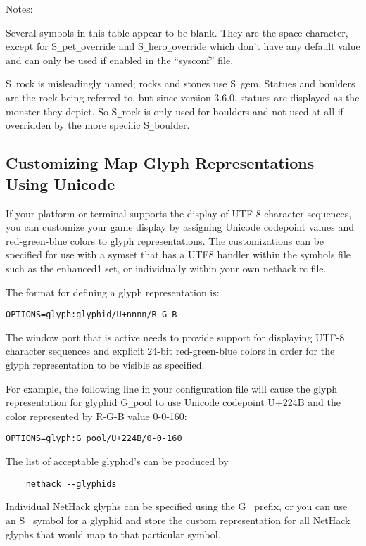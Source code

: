 Notes:

Several symbols in this table appear to be blank.
They are the space character, except for S\verb+_+pet\verb+_+override
and S\verb+_+hero\verb+_+override which don't have any default value
and can only be used if enabled in the ``sysconf'' file.

S\verb+_+rock is misleadingly named; rocks and stones use S\verb+_+gem.
Statues and boulders are the rock being referred to, but since
version 3.6.0, statues are displayed as the monster they depict.
So S\verb+_+rock is only used for boulders and not used at all if
overridden by the more specific S\verb+_+boulder.

\subsection*{Customizing Map Glyph Representations Using Unicode}

If your platform or terminal supports the display of UTF-8 character
sequences, you can customize your game display by assigning Unicode
codepoint values and red-green-blue colors to glyph
representations. The customizations can be specified for use with a symset that
has a UTF8 handler within the symbols file such as the enhanced1 set, or
individually within your own nethack.rc file.

The format for defining a glyph representation is:\\
\begin{verbatim}
OPTIONS=glyph:glyphid/U+nnnn/R-G-B
\end{verbatim}

The window port that is active needs to provide support for displaying UTF-8
character sequences and explicit 24-bit red-green-blue colors in order for the glyph
representation to be visible as specified.

For example, the following line in your configuration file will cause
the glyph representation for glyphid G\verb+_+pool to use Unicode codepoint U+224B
and the color represented by R-G-B value 0-0-160:\\
\begin{verbatim}
OPTIONS=glyph:G_pool/U+224B/0-0-160
\end{verbatim}

The list of acceptable glyphid's can be produced by 
\begin{verbatim}
    nethack --glyphids
\end{verbatim}
Individual NetHack glyphs can be specified using the G\verb+_+ prefix,
or you can use an S\verb+_+ symbol for a glyphid and store the custom
representation for all NetHack glyphs that would map to that
particular symbol.

